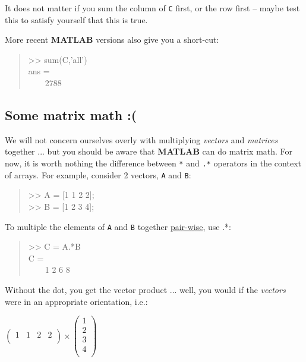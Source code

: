 \documentclass{tufte-book} %
\newenvironment{docspec}{\begin{quotation}\ttfamily\parskip0pt\parindent0pt\ignorespaces}{\end{quotation}}
\begin{document}
It does not matter if you sum the column of \texttt{C} first, or the row first -- maybe test this to satisfy yourself that this is true.

More recent \textbf{MATLAB} versions also give you a short-cut:
\begin{docspec}
>> sum(C,'all')\\
ans = \\
\ \ \ \ 2788\\
\end{docspec}


\subsection{Some matrix math :(}

We will not concern ourselves overly with multiplying \textit{vectors} and \textit{matrices} together ... but you should be aware that \textbf{MATLAB} can do matrix math. For now, it is worth nothing the difference between \texttt{*} and \texttt{.*} operators in the context of arrays. For example, consider 2 vectors, \texttt{A} and \texttt{B}:

\begin{docspec}
>> A = [1 1 2 2];\\
>> B = [1 2 3 4];
\end{docspec}

To multiple the elements of \texttt{A} and \texttt{B} together \uline{pair-wise}, use .*:

\begin{docspec}
>> C = A.*B
\\
C =\\
\ \ \ \ 1     2     6     8
\end{docspec}

Without the dot, you get the vector product ... well, you would if the \textit{vectors} were in an appropriate orientation, i.e.:

\vspace{1mm}
\(\begin{pmatrix}1 & 1 & 2 & 2 \\
\end{pmatrix}\times\begin{pmatrix}1 \\
2 \\
3 \\
4 \\
\end{pmatrix}\)
\vspace{1mm}
\end{document}
